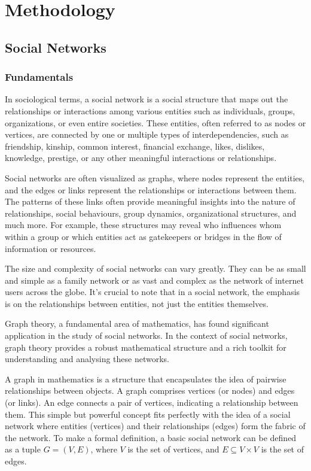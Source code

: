\chapter{Methodology}
\label{ch:methods}

\section{Social Networks}
\label{sec:social_networks}

\subsection{Fundamentals}
\label{sec:social_networks_fundamentals}

In sociological terms, a social network is a social structure that maps out the relationships or interactions among various entities such as individuals, groups, organizations, or even entire societies. These entities, often referred to as nodes or vertices, are connected by one or multiple types of interdependencies, such as friendship, kinship, common interest, financial exchange, likes, dislikes, knowledge, prestige, or any other meaningful interactions or relationships.

Social networks are often visualized as graphs, where nodes represent the entities, and the edges or links represent the relationships or interactions between them. The patterns of these links often provide meaningful insights into the nature of relationships, social behaviours, group dynamics, organizational structures, and much more. For example, these structures may reveal who influences whom within a group or which entities act as gatekeepers or bridges in the flow of information or resources.

The size and complexity of social networks can vary greatly. They can be as small and simple as a family network or as vast and complex as the network of internet users across the globe. It's crucial to note that in a social network, the emphasis is on the relationships between entities, not just the entities themselves.

Graph theory, a fundamental area of mathematics, has found significant application in the study of social networks. In the context of social networks, graph theory provides a robust mathematical structure and a rich toolkit for understanding and analysing these networks.

A graph in mathematics is a structure that encapsulates the idea of pairwise relationships between objects. A graph comprises vertices (or nodes) and edges (or links). An edge connects a pair of vertices, indicating a relationship between them. This simple but powerful concept fits perfectly with the idea of a social network where entities (vertices) and their relationships (edges) form the fabric of the network. To make a formal definition, a basic social network can be defined as a tuple $G = (V,E)$, where $V$ is the set of vertices, and $E \subseteq V \times V$ is the set of edges.

